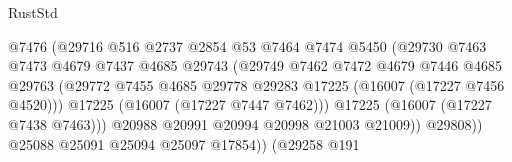 \begin{lexlean}{RustStd}
\begin{coremodule}
                                            @7476
                                            (@29716
                                              @516
                                              @2737
                                              @2854
                                              @53
                                              @7464
                                              @7474
                                              @5450
                                              (@29730
                                                @7463
                                                @7473
                                                @4679
                                                @7437
                                                @4685
                                                @29743
                                                (@29749
                                                  @7462
                                                  @7472
                                                  @4679
                                                  @7446
                                                  @4685
                                                  @29763
                                                  (@29772
                                                    @7455
                                                    @4685
                                                    @29778
                                                    @29283
                                                    @17225
                                                    (@16007 (@17227 @7456 @4520)))
                                                  @17225
                                                  (@16007 (@17227 @7447 @7462)))
                                                @17225
                                                (@16007 (@17227 @7438 @7463)))
                                              @20988
                                              @20991
                                              @20994
                                              @20998
                                              @21003
                                              @21009))
                                          @29808))
                                      @25088
                                      @25091
                                      @25094
                                      @25097
                                      @17854))
                                  (@29258
                                    @191

\end{coremodule}
\end{lexlean}
